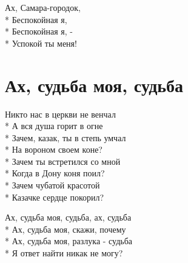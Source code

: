 \medskip

\begin{minipage}{\linewidth}
\hspace*{1.5em}Ах, Самара-городок,\\*
\hspace*{1.5em}Беспокойная я,\\*
\hspace*{1.5em}Беспокойная я, - \\*
\hspace*{1.5em}Успокой ты меня!\\
\end{minipage}

\vspace{\fill}\newpage

\section{Ах, судьба моя, судьба}
\label{song:Ах,_судьба_моя,_судьба}

\medskip

\begin{minipage}{\linewidth}
Никто нас в церкви не венчал\\*
А вся душа горит в огне\\*
Зачем, казак, ты в степь умчал\\*
На вороном своем коне?\\*
Зачем ты встретился со мной\\*
Когда в Дону коня поил?\\*
Зачем чубатой красотой\\*
Казачке сердце покорил?\\
\end{minipage}\par\medskip\nobreak

\medskip

\begin{minipage}{\linewidth}
\hspace*{1.5em}Ах, судьба моя, судьба, ах, судьба\\*
\hspace*{1.5em}Ах, судьба моя, скажи, почему\\*
\hspace*{1.5em}Ах, судьба моя, разлука - судьба\\*
\hspace*{1.5em}Я ответ найти никак не могу?\\
\end{minipage}\par\medskip\nobreak

